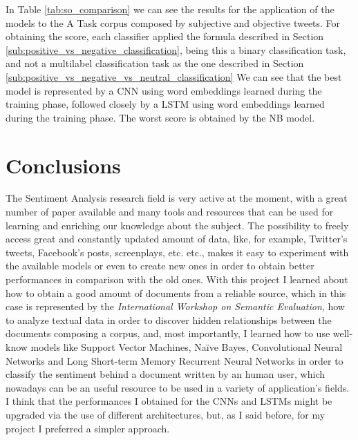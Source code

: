 \documentclass[11pt,twocolumn]{article}
\begin{document}
            \noindent
            In Table \ref{tab:so_comparison} we can see the results for the application
            of the models to the A Task corpus composed by subjective and objective tweets. For obtaining the
            score, each classifier applied the formula described in Section
            \ref{sub:positive_vs_negative_classification}, being this a binary classification task, and not a
            multilabel classification task as the one described in Section
            \ref{sub:positive_vs_negative_vs_neutral_classification} We can see that the best model is
            represented by a CNN using word embeddings learned during the training phase, followed closely by a
            LSTM using word embeddings learned during the training phase. The worst score is obtained by the NB
            model.

    \section{Conclusions} %
    \label{sec:conclusions}
        The Sentiment Analysis research field is very active at the moment, with a great number of paper
        available and many tools and resources that can be used for learning and enriching our knowledge
        about the subject. The possibility to freely access great and constantly updated amount of data, like, for
        example, Twitter's tweets, Facebook's posts, screenplays, etc. etc., makes it easy to experiment
        with the available models or even to create new ones in order to obtain better performances in
        comparison with the old ones. With this project I learned about how to obtain a good amount of
        documents from a reliable source, which in this case is represented by the
        \textit{International Workshop on Semantic Evaluation}, how to analyze textual data in order to
        discover hidden relationships between the documents composing a corpus, and, most importantly, I
        learned how to use well-know models like Support Vector Machines, Naïve Bayes, Convolutional Neural
        Networks and Long Short-term Memory Recurrent Neural Networks in order to classify the sentiment
        behind a document written by an human user, which nowadays can be an useful resource to be used
        in a variety of application's fields. I think that the performances I obtained for the CNNs and LSTMs
        might be upgraded via the use of different architectures, but, as I said before, for my project I
        preferred a simpler approach.
\end{document}
